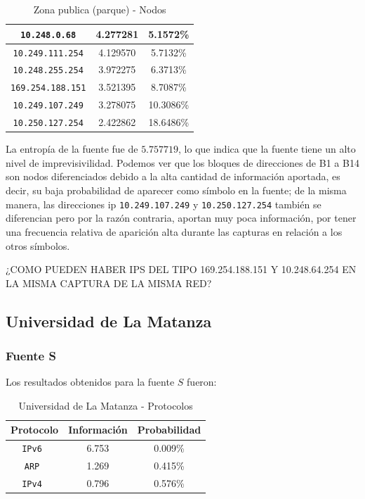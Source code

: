 \documentclass[final,inline,narroweqnarray,a4paper]{ieee}
\begin{document}
\begin{table}[H]
\begin{center}
\begin{tabular}{|c|c|c|}
            \texttt{10.248.0.68} &4.277281 &5.1572\%     \\ \hline 
            \texttt{10.249.111.254} &4.129570 &5.7132\%     \\ \hline 
            \texttt{10.248.255.254} &3.972275 &6.3713\%     \\ \hline 
            \texttt{169.254.188.151} &3.521395 &8.7087\%     \\ \hline 
            \texttt{10.249.107.249} &3.278075 &10.3086\%     \\ \hline 
            \texttt{10.250.127.254} &2.422862 &18.6486\%     \\ \hline                                    
        \end{tabular}
        \caption{Zona publica (parque) - Nodos}
        \label{table:parqueS1}
    \end{center}
\end{table}

La entropía de la fuente fue de $5.757719$, lo que indica que la fuente tiene un alto nivel de imprevisivilidad. Podemos ver que los bloques de direcciones de B1 a B14 son nodos diferenciados debido a la alta cantidad de información aportada, es decir, su baja probabilidad de aparecer como símbolo en la fuente; de la misma manera, las direcciones ip \texttt{10.249.107.249} y \texttt{10.250.127.254} también se diferencian pero por la razón contraria, aportan muy poca información, por tener una frecuencia relativa de aparición alta durante las capturas en relación a los otros símbolos.

¿COMO PUEDEN HABER IPS DEL TIPO 169.254.188.151 Y 10.248.64.254 EN LA MISMA CAPTURA DE LA MISMA RED?

\subsection{Universidad de La Matanza}
\subsubsection{Fuente S}

Los resultados obtenidos para la fuente $S$ fueron:

\begin{table}[H]
    \begin{center}
        \begin{tabular}{|c|c|c|}
            \hline
            \textbf{Protocolo} & \textbf{Información} & \textbf{Probabilidad} \\ \hline
            \texttt{IPv6      }& 6.753        & 0.009\%     \\ \hline
            \texttt{ARP       }& 1.269        & 0.415\%     \\ \hline
	    \texttt{IPv4      }& 0.796        & 0.576\%     \\ \hline
        \end{tabular}
        \caption{Universidad de La Matanza - Protocolos}
        \label{table:universidadLMS}
    \end{center}
\end{table} 
\end{document}
